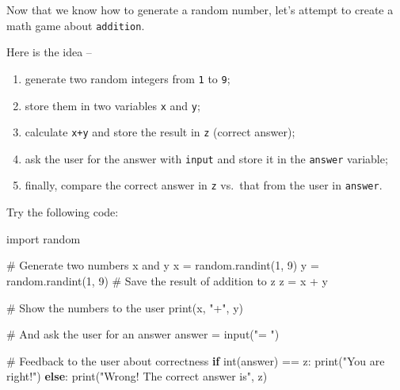 \documentclass[
  letterpaper,
]{scrbook}
\newenvironment{Shaded}{\begin{snugshade}}{\end{snugshade}}
\newcommand{\BuiltInTok}[1]{\textcolor[rgb]{0.00,0.23,0.31}{#1}}
\newcommand{\CommentTok}[1]{\textcolor[rgb]{0.37,0.37,0.37}{#1}}
\newcommand{\ControlFlowTok}[1]{\textcolor[rgb]{0.00,0.23,0.31}{\textbf{#1}}}
\newcommand{\DecValTok}[1]{\textcolor[rgb]{0.68,0.00,0.00}{#1}}
\newcommand{\ImportTok}[1]{\textcolor[rgb]{0.00,0.46,0.62}{#1}}
\newcommand{\NormalTok}[1]{\textcolor[rgb]{0.00,0.23,0.31}{#1}}
\newcommand{\OperatorTok}[1]{\textcolor[rgb]{0.37,0.37,0.37}{#1}}
\newcommand{\StringTok}[1]{\textcolor[rgb]{0.13,0.47,0.30}{#1}}
\providecommand{\tightlist}{%
  \setlength{\itemsep}{0pt}\setlength{\parskip}{0pt}}
\begin{document}

Now that we know how to generate a random number, let's attempt to
create a math game about \texttt{addition}.

Here is the idea --

\begin{enumerate}
\def\labelenumi{\arabic{enumi}.}
\tightlist
\item
  generate two random integers from \texttt{1} to \texttt{9};
\item
  store them in two variables \texttt{x} and \texttt{y};
\item
  calculate \texttt{x+y} and store the result in \texttt{z} (correct
  answer);
\item
  ask the user for the answer with \texttt{input} and store it in the
  \texttt{answer} variable;
\item
  finally, compare the correct answer in \texttt{z} vs.~that from the
  user in \texttt{answer}.
\end{enumerate}

Try the following code:

\begin{Shaded}
\begin{Highlighting}[]
\ImportTok{import}\NormalTok{ random}

\CommentTok{\# Generate two numbers x and y}
\NormalTok{x }\OperatorTok{=}\NormalTok{ random.randint(}\DecValTok{1}\NormalTok{, }\DecValTok{9}\NormalTok{)}
\NormalTok{y }\OperatorTok{=}\NormalTok{ random.randint(}\DecValTok{1}\NormalTok{, }\DecValTok{9}\NormalTok{)}
\CommentTok{\# Save the result of addition to z}
\NormalTok{z }\OperatorTok{=}\NormalTok{ x }\OperatorTok{+}\NormalTok{ y}

\CommentTok{\# Show the numbers to the user}
\BuiltInTok{print}\NormalTok{(x, }\StringTok{"+"}\NormalTok{, y)}

\CommentTok{\# And ask the user for an answer}
\NormalTok{answer }\OperatorTok{=} \BuiltInTok{input}\NormalTok{(}\StringTok{"= "}\NormalTok{)}

\CommentTok{\# Feedback to the user about correctness}
\ControlFlowTok{if} \BuiltInTok{int}\NormalTok{(answer) }\OperatorTok{==}\NormalTok{ z:}
  \BuiltInTok{print}\NormalTok{(}\StringTok{"You are right!"}\NormalTok{)}
\ControlFlowTok{else}\NormalTok{:}
  \BuiltInTok{print}\NormalTok{(}\StringTok{"Wrong! The correct answer is"}\NormalTok{, z)}
\end{Highlighting}
\end{Shaded}
\end{document}
